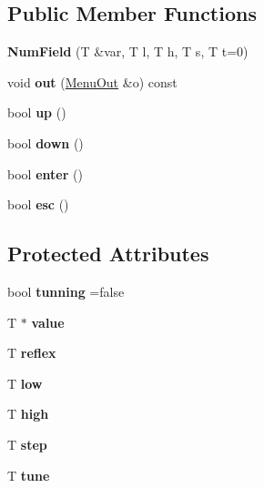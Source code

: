 \subsection*{Public Member Functions}
\begin{DoxyCompactItemize}
\item 
\mbox{\label{classNumField_ac31c0e5c4a8dfc82780e643140c608f8}} 
{\bfseries Num\+Field} (T \&var, T l, T h, T s, T t=0)
\item 
\mbox{\label{classNumField_a0f94b131552e24e24516ed07c3345564}} 
void {\bfseries out} (\hyperlink{structMenuOut}{Menu\+Out} \&o) const
\item 
\mbox{\label{classNumField_a1fc5409fdd22fbca9ffcfdbe90cf9929}} 
bool {\bfseries up} ()
\item 
\mbox{\label{classNumField_ae0bd47d4969d695fa7cff81e44d4dff9}} 
bool {\bfseries down} ()
\item 
\mbox{\label{classNumField_abe795198b4e2b95502933164d3cd64ec}} 
bool {\bfseries enter} ()
\item 
\mbox{\label{classNumField_ae7697ba53072d3eacf0a041c93140f4e}} 
bool {\bfseries esc} ()
\end{DoxyCompactItemize}
\subsection*{Protected Attributes}
\begin{DoxyCompactItemize}
\item 
\mbox{\label{classNumField_a1c72fd5bc1775e6cfaed2b4594ac0700}} 
bool {\bfseries tunning} =false
\item 
\mbox{\label{classNumField_a548ac7ac150b3b12811bfef53d9636a5}} 
T $\ast$ {\bfseries value}
\item 
\mbox{\label{classNumField_ad17a73e2250ebbd5dda7ee3a79dfb522}} 
T {\bfseries reflex}
\item 
\mbox{\label{classNumField_a9e04257f27cf53402e8d787b6a1d561e}} 
T {\bfseries low}
\item 
\mbox{\label{classNumField_ab40ba1ee654bc48e827b78297b384714}} 
T {\bfseries high}
\item 
\mbox{\label{classNumField_acd99c4f2a3c0b3477535399485782827}} 
T {\bfseries step}
\item 
\mbox{\label{classNumField_af28a046a1c71b17e8ac7ed17abba03ff}} 
T {\bfseries tune}
\end{DoxyCompactItemize}


